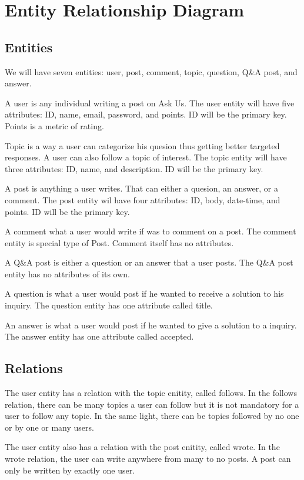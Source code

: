 \section{Entity Relationship Diagram}
\subsection{Entities}
We will have seven entities: user, post, comment, topic, question, Q\&A post, and answer.

A user is any individual writing a post on Ask Us. The user entity will have five attributes: ID, name, email, password, and points. ID will be the primary key. Points is a metric of rating.

Topic is a way a user can categorize his quesion thus getting better targeted responses. A user can also follow a topic of interest. The topic entity will have three attributes: ID, name, and description. ID will be the primary key.

A post is anything a user writes. That can either a quesion, an answer, or a comment. The post entity wil have four attributes: ID, body, date-time, and points. ID will be the primary key.

A comment what a user would write if was to comment on a post. The comment entity is special type of Post. Comment itself has no attributes.

A Q\&A post is either a question or an answer that a user posts. The Q\&A post entity has no attributes of its own.

A question is what a user would post if he wanted to receive a solution to his inquiry. The question entity has one attribute called title.

An answer is what a user would post if he wanted to give a solution to a inquiry. The answer entity has one attribute called accepted.

\subsection{Relations}
The user entity has a relation with the topic enitity, called follows. In the follows relation, there can be many topics a user can follow but it is not mandatory for a user to follow any topic. In the same light, there can be topics followed by no one or by one or many users.

The user entity also has a relation with the post enitity, called wrote. In the wrote relation, the user can write anywhere from many to no posts. A post can only be written by exactly one user.

